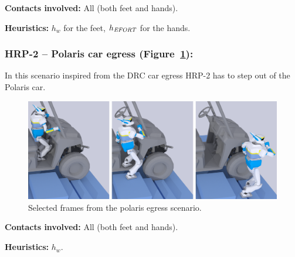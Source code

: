 \noindent\textbf{Contacts involved:} All (both feet and hands).

\noindent\textbf{Heuristics:} $h_w$ for the feet, $h_{\textrm{\it EFORT}}$  for the hands.



\subsubsection{HRP-2 -- Polaris car egress (Figure~\ref{fig:car}):}
In this scenario inspired from the DRC car egress HRP-2 has to step out of the Polaris car.

\begin{figure}
  \centering
  \includegraphics[width=1\linewidth]{figures/polaris}
  \caption{
           Selected frames from the polaris egress scenario. }
		   \label{fig:car}
\end{figure}


\noindent\textbf{Contacts involved:} All (both feet and hands).

\noindent\textbf{Heuristics:} $h_w$.



